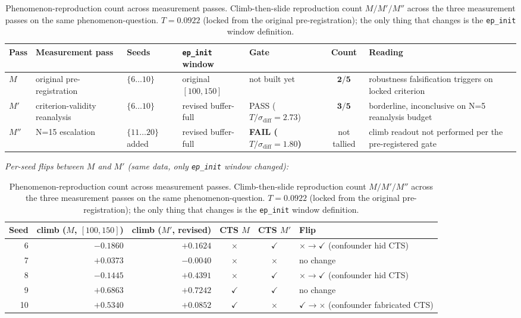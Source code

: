 \documentclass{article}
\newcommand{\code}[1]{\texttt{#1}}
\begin{document}
\begin{table}[!ht]
\centering
\caption{Phenomenon-reproduction count across measurement passes. Climb-then-slide reproduction count $M / M' / M''$ across the three measurement passes on the same phenomenon-question. $T = 0.0922$ (locked from the original pre-registration); the only thing that changes is the \code{ep\_init} window definition.}
\label{tab:1}
\small
\setlength{\tabcolsep}{4pt}
\begin{tabular}{@{}l p{2.0cm} l p{1.4cm} p{1.5cm} c p{2.8cm}@{}}
\toprule
Pass & Measurement pass & Seeds & \code{ep\_init} window & Gate & Count & Reading \\
\midrule
$M$    & original pre-registration   & $\{6 \ldots 10\}$       & original $[100,150]$ & not built yet                                    & $\mathbf{2/5}$ & robustness falsification triggers on locked criterion \\
$M'$   & criterion-validity reanalysis & $\{6 \ldots 10\}$     & revised buffer-full  & PASS ($T/\sigma_\mathrm{diff}\!=\!2.73$)         & $\mathbf{3/5}$ & borderline, inconclusive on N=5 reanalysis budget \\
$M''$  & N=15 escalation             & $\{11 \ldots 20\}$ added & revised buffer-full & \textbf{FAIL ($T/\sigma_\mathrm{diff}\!=\!1.80$)} & not tallied   & climb readout not performed per the pre-registered gate \\
\bottomrule
\end{tabular}

\vspace{1em}

\textit{Per-seed flips between $M$ and $M'$ (same data, only \code{ep\_init} window changed):}

\vspace{0.5em}

\begin{tabular}{@{}r r r c c p{4.3cm}@{}}
\toprule
Seed & climb ($M$, $[100,150]$) & climb ($M'$, revised) & CTS $M$ & CTS $M'$ & Flip \\
\midrule
6  & $-0.1860$ & $+0.1624$ & $\times$ & $\checkmark$ & $\times \to \checkmark$ (confounder hid CTS) \\
7  & $+0.0373$ & $-0.0040$ & $\times$ & $\times$ & no change \\
8  & $-0.1445$ & $+0.4391$ & $\times$ & $\checkmark$ & $\times \to \checkmark$ (confounder hid CTS) \\
9  & $+0.6863$ & $+0.7242$ & $\checkmark$ & $\checkmark$ & no change \\
10 & $+0.5340$ & $+0.0852$ & $\checkmark$ & $\times$ & $\checkmark \to \times$ (confounder fabricated CTS) \\
\bottomrule
\end{tabular}
\end{table}
\end{document}
